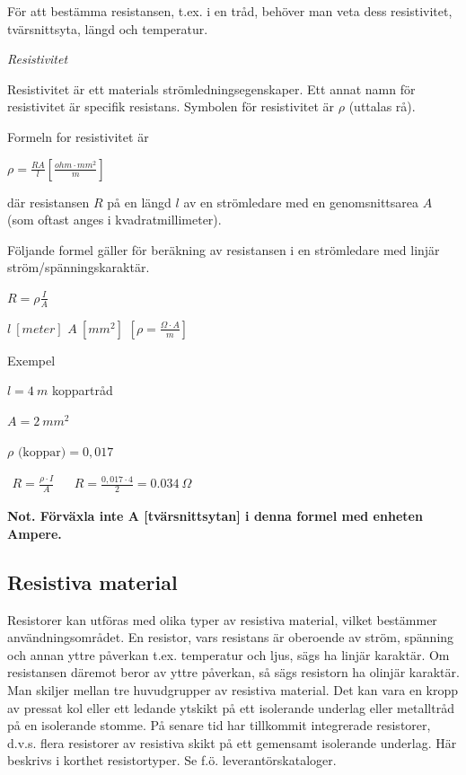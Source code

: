För att bestämma resistansen, t.ex. i en tråd,
behöver man veta dess resistivitet, tvärsnittsyta, längd och temperatur.

\emph{Resistivitet}

Resistivitet är ett materials strömledningsegenskaper. Ett annat namn för
resistivitet är specifik resistans. Symbolen för resistivitet är \(\rho\)
(uttalas rå).

Formeln for resistivitet är

\(\rho = \frac{R A}{l} \left[\frac{ohm \cdot mm^2}{m}\right]\)

där resistansen \(R\) på en längd \(l\) av en strömledare med en
genomsnittsarea \(A\) (som oftast anges i kvadratmillimeter).

Följande formel gäller för beräkning av resistansen i en strömledare med
linjär ström/spänningskaraktär.

\(R = \rho \frac{I}{A} \)

\(l\ [meter]\) \(A\ [mm^2]\) \(\left[\rho = \frac{\Omega \cdot A}{m} \right]\)

Exempel

\(l = 4\ m\) koppartråd

\(A = 2\ mm^2\)

\(\rho \text{ (koppar)} = 0,017\)

\(
\begin{array}{lll}
R = \frac{\rho \cdot I}{A} & & R = \frac{0,017 \cdot 4}{2} = 0.034\ \Omega
\end{array}
\)

\textbf{Not. Förväxla inte A [tvärsnittsytan] i denna formel med enheten Ampere.}

\subsection{Resistiva material}

Resistorer kan utföras med olika typer av resistiva material, vilket bestämmer
användningsområdet. En resistor, vars resistans är oberoende av ström, spänning
och annan yttre påverkan t.ex. temperatur och ljus, sägs ha linjär karaktär.
Om resistansen däremot beror av yttre påverkan, så sägs resistorn ha olinjär
karaktär. Man skiljer mellan tre huvudgrupper av resistiva material. Det kan
vara en kropp av pressat kol eller ett ledande ytskikt på ett isolerande
underlag eller metalltråd på en isolerande stomme. På senare tid har tillkommit
integrerade resistorer, d.v.s. flera resistorer av resistiva skikt på ett
gemensamt isolerande underlag. Här beskrivs i korthet resistortyper.
Se f.ö. leverantörskataloger.

